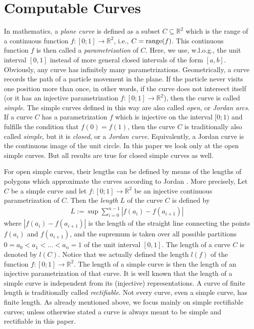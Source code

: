 \documentclass{LMCS}
\theoremstyle{plain}
\def\IR{\mathbb{R}}
\begin{document}
\section{Computable Curves}\label{sec-comp-curve}

In mathematics, a {\em plane curve} is defined as a subset $C \subseteq \IR^2$ which is the range of a continuous function $f:[0;1]\to \IR^2$, i.e., $C = {\rm range}(f)$. This continuous function $f$ is then called a {\em parametrization} of $C$. Here, we use, w.l.o.g., the unit interval $[0,1]$ instead of more general closed intervals of the form $[a,b]$. Obviously, any curve has infinitely many parametrizations. Geometrically, a curve records the path of a particle movement in the plane. If the particle never visits one position more than once, in other words, if the curve does not intersect itself (or it has an injective parametrization $f:[0;1] \to \IR^2$), then the curve is called {\em simple}. The simple curves defined in this way are also called {\em open}, or {\em Jordan arcs}. If a curve $C$ has a parametrization $f$ which is injective on the interval $[0;1)$ and fulfills the condition that $f(0)=f(1)$, then the curve $C$ is traditionally also called {\em simple}, but it is {\em closed}, or a {\em Jordan curve}. Equivalently, a Jordan curve is the continuous image of the unit circle. In this paper we look only at the open simple curves. But all results are true for closed simple curves as well.

For open simple curves, their lengths can be defined by means of the lengths of polygons which approximate the curves according to Jordan \cite{Jor1882}. More precisely, Let $C$ be a simple curve and let $f:[0;1] \to \IR^2$ be an injective continuous parametrization of $C$. Then the {\em length} $L$ of the curve $C$ is defined by
\begin{eqnarray}\label{def-arc-length}
L := \sup \sum_{i=0}^{n-1} |f(a_i) -f(a_{i+1})|
\end{eqnarray}
where $|f(a_i) -f(a_{i+1})|$ is the length of the straight line connecting the points $f(a_i)$ and $f(a_{i+1})$, and the supremum is taken over all possible partitions $0=a_0<a_1<...<a_n=1$ of the unit interval $[0,1]$. The length of a curve $C$ is denoted by $l(C)$. Notice that we actually defined the length $l(f)$ of the function $f:[0;1]\rightarrow \IR^2$. The length of a simple curve is then the length of an injective parametrization of that curve. It is well known that the length of a simple curve is independent from its (injective) representations.  A curve of finite length is traditionally called {\em rectifiable}. Not every curve, even a simple curve,  has finite length. As already mentioned above, we focus mainly on simple rectifiable curves; unless otherwise stated a curve is always meant to be simple and rectifiable in this paper.
\end{document}
